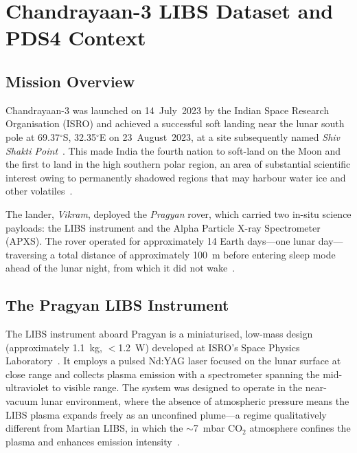 \documentclass[a4paper,twocolumn,10pt]{article}
\begin{document}
\section{Chandrayaan-3 LIBS Dataset and PDS4 Context}
\label{sec:data}

\subsection{Mission Overview}

Chandrayaan-3 was launched on 14~July~2023 by the Indian Space Research
Organisation (ISRO) and achieved a successful soft landing near the
lunar south pole at 69.37$^\circ$S, 32.35$^\circ$E on 23~August~2023,
at a site subsequently named \emph{Shiv Shakti Point}~\cite{ISROCh3}.
This made India the fourth nation to soft-land on the Moon and the
first to land in the high southern polar region, an area of
substantial scientific interest owing to permanently shadowed regions
that may harbour water ice and other volatiles~\cite{Colaprete2010,
Li2018}.

The lander, \emph{Vikram}, deployed the \emph{Pragyan} rover, which
carried two in-situ science payloads: the LIBS instrument and the
Alpha Particle X-ray Spectrometer (APXS).  The rover operated for
approximately 14 Earth days---one lunar day---traversing a total
distance of approximately 100~m before entering sleep mode ahead of
the lunar night, from which it did not wake~\cite{Saeidfirozeh2024}.

\subsection{The Pragyan LIBS Instrument}

The LIBS instrument aboard Pragyan is a miniaturised, low-mass design
(approximately 1.1~kg, $<$1.2~W) developed at ISRO's Space Physics
Laboratory~\cite{Laxmiprasad2020}.  It employs a pulsed Nd:YAG laser
focused on the lunar surface at close range and collects plasma
emission with a spectrometer spanning the mid-ultraviolet to visible
range.  The system was designed to operate in the near-vacuum lunar
environment, where the absence of atmospheric pressure means the LIBS
plasma expands freely as an unconfined plume---a regime qualitatively
different from Martian LIBS, in which the $\sim$7~mbar CO$_2$
atmosphere confines the plasma and enhances emission
intensity~\cite{Knight2000,Saeidfirozeh2024}.
\end{document}
